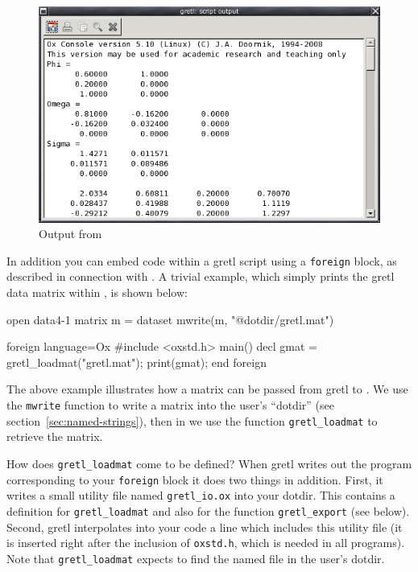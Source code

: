 \begin{figure}[htbp]
  \centering
  \includegraphics[scale=0.7]{figures/Oxout}
  \caption{Output from }
  \label{fig:Oxout}
\end{figure}

In addition you can embed  code within a gretl script
using a \texttt{foreign} block, as described in connection with
.  A trivial example, which simply prints the gretl data
matrix within , is shown below:
%
\begin{code}
open data4-1
matrix m = { dataset }
mwrite(m, "@dotdir/gretl.mat")

foreign language=Ox 
#include <oxstd.h>
main()
{
   decl gmat = gretl_loadmat("gretl.mat");
   print(gmat);
}
end foreign
\end{code}

The above example illustrates how a matrix can be passed from
gretl to .  We use the \texttt{mwrite} function to write
a matrix into the user's ``dotdir'' (see
section~\ref{sec:named-strings}), then in  we use the function
\verb|gretl_loadmat| to retrieve the matrix.

How does \verb|gretl_loadmat| come to be defined?  When gretl
writes out the  program corresponding to your \texttt{foreign}
block it does two things in addition.  First, it writes a small
utility file named \verb|gretl_io.ox| into your dotdir.  This contains
a definition for \verb|gretl_loadmat| and also for the function
\verb|gretl_export| (see below).  Second, gretl interpolates
into your  code a line which includes this utility file (it is
inserted right after the inclusion of \texttt{oxstd.h}, which is
needed in all  programs).  Note that \verb|gretl_loadmat|
expects to find the named file in the user's dotdir.


